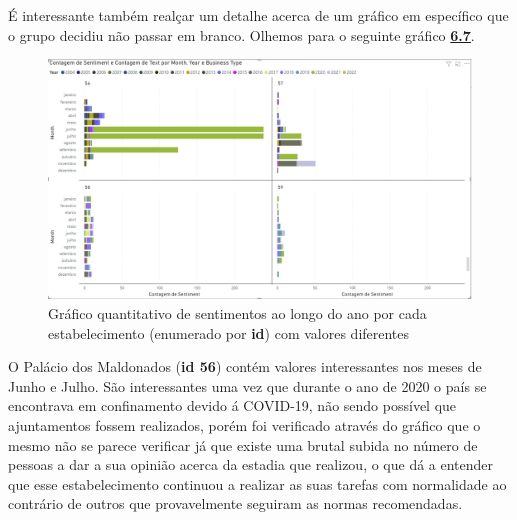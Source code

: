 É interessante também realçar um detalhe acerca de um gráfico em específico que o grupo decidiu não passar em branco. Olhemos para o seguinte gráfico \hyperref[fig:figStrange]{\textbf{6.7}}.

\begin{figure}[!htb]
\centering
\includegraphics[width=14cm]{figuras/NrReviewsPerYear&BusinessType/9.PNG}
\caption{Gráfico quantitativo de sentimentos ao longo do ano por cada estabelecimento (enumerado por \textbf{id}) com valores diferentes}
\label{fig:figStrange}
\end{figure}

O Palácio dos Maldonados (\textbf{id 56}) contém valores interessantes nos meses de Junho e Julho. São interessantes uma vez que durante o ano de 2020 o país se encontrava em confinamento devido á COVID-19, não sendo possível que ajuntamentos fossem realizados, porém foi verificado através do gráfico que o mesmo não se parece verificar já que existe uma brutal subida no número de pessoas a dar a sua opinião acerca da estadia que realizou, o que dá a entender que esse estabelecimento continuou a realizar as suas tarefas com normalidade ao contrário de outros que provavelmente seguiram as normas recomendadas.